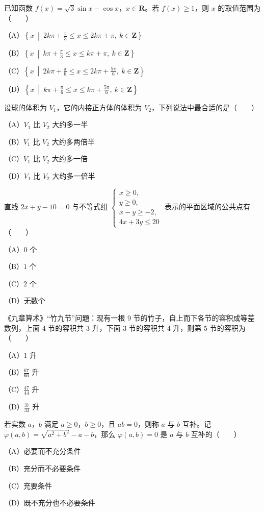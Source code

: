 \begin{question}
已知函数 $f(x)=\sqrt3\sin x-\cos x$，$x\in\mathbf R$。若 $f(x)\geqslant1$，则 $x$ 的取值范围为\mbox{（　　）}

（A）$\left\{x\ \middle|\ 2k\pi+\frac\pi3\leqslant x\leqslant2k\pi+\pi,\ k\in\mathbf Z\right\}$

（B）$\left\{x\ \middle|\ k\pi+\frac\pi3\leqslant x\leqslant k\pi+\pi,\ k\in\mathbf Z\right\}$

（C）$\left\{x\ \middle|\ 2k\pi+\frac\pi6\leqslant x\leqslant2k\pi+\frac{5\pi}6,\ k\in\mathbf Z\right\}$

（D）$\left\{x\ \middle|\ k\pi+\frac\pi6\leqslant x\leqslant k\pi+\frac{5\pi}6,\ k\in\mathbf Z\right\}$

\end{question}
\begin{question}
设球的体积为 $V_1$，它的内接正方体的体积为 $V_2$，下列说法中最合适的是\mbox{（　　）}

（A）$V_1$ 比 $V_2$ 大约多一半

（B）$V_1$ 比 $V_2$ 大约多两倍半

（C）$V_1$ 比 $V_2$ 大约多一倍

（D）$V_1$ 比 $V_2$ 大约多一倍半

\end{question}
\begin{question}
直线 $2x+y-10=0$ 与不等式组 $\begin{cases}x\geqslant0,\\y\geqslant0,\\x-y\geqslant-2,\\4x+3y\leqslant20\end{cases}$ 表示的平面区域的公共点有\mbox{（　　）}

（A）$0$ 个

（B）$1$ 个

（C）$2$ 个

（D）无数个

\end{question}
\begin{question}
《九章算术》“竹九节”问题：现有一根 $9$ 节的竹子，自上而下各节的容积成等差数列，上面 $4$ 节的容积共 $3$ 升，下面 $3$ 节的容积共 $4$ 升，则第 $5$ 节的容积为\mbox{（　　）}

（A）$1$ 升

（B）$\frac{67}{66}$ 升

（C）$\frac{47}{44}$ 升

（D）$\frac{37}{33}$ 升

\end{question}
\begin{question}
若实数 $a$，$b$ 满足 $a\geqslant0$，$b\geqslant0$，且 $ab=0$，则称 $a$ 与 $b$ 互补。记 $\varphi(a,b)=\sqrt{a^2+b^2}-a-b$，那么 $\varphi(a,b)=0$ 是 $a$ 与 $b$ 互补的\mbox{（　　）}

（A）必要而不充分条件

（B）充分而不必要条件

（C）充要条件

（D）既不充分也不必要条件

\end{question}

